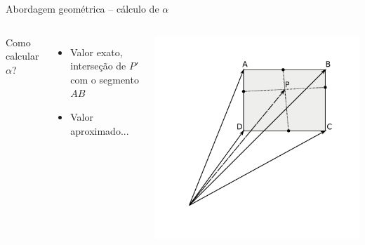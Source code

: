 \documentclass{beamer}
\begin{document}
\begin{frame}{Abordagem geométrica -- cálculo de $\alpha$}
	\begin{columns}
		Como calcular $\alpha$?
		\begin{itemize}
		\pause
		\item Valor exato, interseção de $P'$ com o segmento $AB$
		\pause
		\item Valor aproximado...
		\end{itemize}

		\includegraphics[keepaspectratio, width=1.0\textwidth, height=0.8\textheight, clip, trim=0.75in 0.75in 0.70in 0.50in]{../monografia/img/geometria_ABCD2.pdf}
	\end{columns}
\end{frame}
\end{document}
